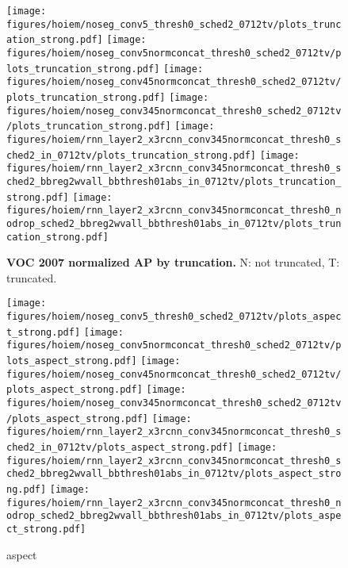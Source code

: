 \begin{figure}[t]
  \begin{center}
   \texttt{[image: figures/hoiem/noseg\_conv5\_thresh0\_sched2\_0712tv/plots\_truncation\_strong.pdf]}
   \texttt{[image: figures/hoiem/noseg\_conv5normconcat\_thresh0\_sched2\_0712tv/plots\_truncation\_strong.pdf]}
   \texttt{[image: figures/hoiem/noseg\_conv45normconcat\_thresh0\_sched2\_0712tv/plots\_truncation\_strong.pdf]}
   \texttt{[image: figures/hoiem/noseg\_conv345normconcat\_thresh0\_sched2\_0712tv/plots\_truncation\_strong.pdf]}
   \texttt{[image: figures/hoiem/rnn\_layer2\_x3rcnn\_conv345normconcat\_thresh0\_sched2\_in\_0712tv/plots\_truncation\_strong.pdf]}
   \texttt{[image: figures/hoiem/rnn\_layer2\_x3rcnn\_conv345normconcat\_thresh0\_sched2\_bbreg2wvall\_bbthresh01abs\_in\_0712tv/plots\_truncation\_strong.pdf]}
   \texttt{[image: figures/hoiem/rnn\_layer2\_x3rcnn\_conv345normconcat\_thresh0\_nodrop\_sched2\_bbreg2wvall\_bbthresh01abs\_in\_0712tv/plots\_truncation\_strong.pdf]}
  \end{center}
  \vspace{-12pt}
  \caption{\textbf{VOC 2007 normalized AP by truncation.}  N: not truncated, T: truncated.
  }
  \label{fig:hoiem}
\end{figure}

\begin{figure}[t]
  \begin{center}
   \texttt{[image: figures/hoiem/noseg\_conv5\_thresh0\_sched2\_0712tv/plots\_aspect\_strong.pdf]}
   \texttt{[image: figures/hoiem/noseg\_conv5normconcat\_thresh0\_sched2\_0712tv/plots\_aspect\_strong.pdf]}
   \texttt{[image: figures/hoiem/noseg\_conv45normconcat\_thresh0\_sched2\_0712tv/plots\_aspect\_strong.pdf]}
   \texttt{[image: figures/hoiem/noseg\_conv345normconcat\_thresh0\_sched2\_0712tv/plots\_aspect\_strong.pdf]}
   \texttt{[image: figures/hoiem/rnn\_layer2\_x3rcnn\_conv345normconcat\_thresh0\_sched2\_in\_0712tv/plots\_aspect\_strong.pdf]}
   \texttt{[image: figures/hoiem/rnn\_layer2\_x3rcnn\_conv345normconcat\_thresh0\_sched2\_bbreg2wvall\_bbthresh01abs\_in\_0712tv/plots\_aspect\_strong.pdf]}
   \texttt{[image: figures/hoiem/rnn\_layer2\_x3rcnn\_conv345normconcat\_thresh0\_nodrop\_sched2\_bbreg2wvall\_bbthresh01abs\_in\_0712tv/plots\_aspect\_strong.pdf]}
  \end{center}
  \vspace{-12pt}
  \caption{aspect
  }
  \label{fig:hoiem}
\end{figure}

